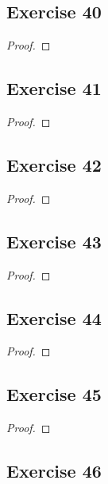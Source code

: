 \documentclass[14pt]{extarticle}
\begin{document}
\subsection{Exercise 40}

\begin{proof}

\end{proof}

\subsection{Exercise 41}

\begin{proof}

\end{proof}

\subsection{Exercise 42}

\begin{proof}

\end{proof}

\subsection{Exercise 43}

\begin{proof}

\end{proof}

\subsection{Exercise 44}

\begin{proof}

\end{proof}

\subsection{Exercise 45}

\begin{proof}

\end{proof}

\subsection{Exercise 46}
\end{document}
